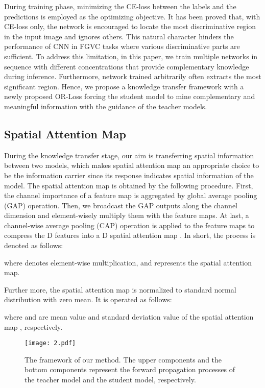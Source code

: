 \documentclass{article}
\begin{document}
During training phase, minimizing the CE-loss between the labels and the predictions is employed as the optimizing objective. It has been proved that, with CE-loss only, the network is encouraged to locate the most discriminative region in the input image \cite{ge2019weakly} and ignores others. This natural character hinders the performance of CNN in FGVC tasks where various discriminative parts are sufficient. To address this limitation, in this paper, we train multiple networks in sequence with different concentrations that provide complementary knowledge during inference. Furthermore, network trained arbitrarily often extracts the most significant region. Hence, we propose a knowledge transfer framework with a newly proposed OR-Loss forcing the student model to mine complementary and meaningful information with the guidance of the teacher models.
\subsection{Spatial Attention Map}

During the knowledge transfer stage, our aim is transferring spatial information between two models, which makes spatial attention map an appropriate choice to be the information carrier since its response indicates spatial information of the model. The spatial attention map is obtained by the following procedure. First, the channel importance of a feature map is aggregated by global average pooling (GAP) operation. Then, we broadcast the GAP outputs along the channel dimension and element-wisely multiply them with the feature maps. At last, a channel-wise average pooling (CAP) operation is applied to the feature maps to compress the D features into a D spatial attention map . In short, the process is denoted as follows:

where  denotes element-wise multiplication, and  represents the spatial attention map. 

Further more, the spatial attention map is normalized to standard normal distribution with zero mean. It is operated as follows:

where  and  are mean value and standard deviation value of the spatial attention map , respectively. 

\begin{figure}[!t]
\centering
\texttt{[image: 2.pdf]}
\caption{The framework of our method. The upper components and the bottom components represent the forward propagation processes of the teacher model and the student model, respectively.}
\label{fig:photo2}
\end{figure}
\end{document}

